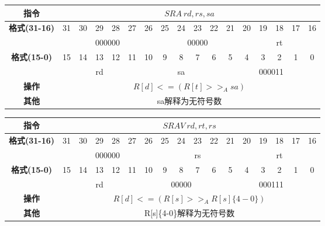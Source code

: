 \documentclass[11pt,utf8]{article}
\begin{document}
\begin{center}
\begin{tabular}{|c|c|c|c|c|c|c|c|c|c|c|c|c|c|c|c|c|}
\hline
\textbf{指令} & \multicolumn{16}{c|}{$SRA~rd, rs, sa$} \\
\hline
\multirow{2}{*}{\textbf{格式(31-16)}} & 31 & 30 & 29 & 28 & 27 & 26 & 25 & 24 & 23 & 22 & 21 & 20 & 19 & 18 & 17 & 16 \\ 
\cline{2-17}
& \multicolumn{6}{c|}{000000} & \multicolumn{5}{c|}{00000} & \multicolumn{5}{c|}{rt}\\
\hline
\multirow{2}{*}{\textbf{格式(15-0)}} & 15 & 14 & 13 & 12 & 11 & 10 & 9 & 8 & 7 & 6 & 5 & 4 & 3 & 2 & 1 & 0 \\
\cline{2-17}
& \multicolumn{5}{c|}{rd} & \multicolumn{5}{c|}{sa} & \multicolumn{6}{c|}{000011}\\
\hline
\textbf{操作} & \multicolumn{16}{c|}{$R[d]<=(R[t]>>_A sa)$} \\
\hline
\textbf{其他} & \multicolumn{16}{c|}{sa解释为无符号数} \\
\hline
\end{tabular}
\end{center}

\begin{center}
\begin{tabular}{|c|c|c|c|c|c|c|c|c|c|c|c|c|c|c|c|c|}
\hline
\textbf{指令} & \multicolumn{16}{c|}{$SRAV~rd, rt, rs$} \\
\hline
\multirow{2}{*}{\textbf{格式(31-16)}} & 31 & 30 & 29 & 28 & 27 & 26 & 25 & 24 & 23 & 22 & 21 & 20 & 19 & 18 & 17 & 16 \\ 
\cline{2-17}
& \multicolumn{6}{c|}{000000} & \multicolumn{5}{c|}{rs} & \multicolumn{5}{c|}{rt}\\
\hline
\multirow{2}{*}{\textbf{格式(15-0)}} & 15 & 14 & 13 & 12 & 11 & 10 & 9 & 8 & 7 & 6 & 5 & 4 & 3 & 2 & 1 & 0 \\
\cline{2-17}
& \multicolumn{5}{c|}{rd} & \multicolumn{5}{c|}{00000} & \multicolumn{6}{c|}{000111}\\
\hline
\textbf{操作} & \multicolumn{16}{c|}{$R[d]<=(R[s]>>_A R[s]\{4-0\})$} \\
\hline
\textbf{其他} & \multicolumn{16}{c|}{R[s]\{4-0\}解释为无符号数} \\
\hline
\end{tabular}
\end{center}
\end{document}
